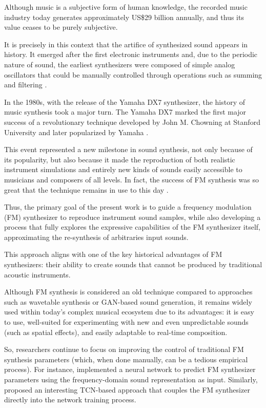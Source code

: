 \documentclass[10pt,conference]{IEEEtran}
\begin{document}
Although music is a subjective form of human knowledge, the recorded music industry today generates approximately US\$29 billion \cite{ifpi2025} annually, and thus its value ceases to be purely subjective.

It is precisely in this context that the artifice of synthesized sound appears in history. It emerged after the first electronic instruments and, due to the periodic nature of sound, the earliest synthesizers were composed of simple analog oscillators that could be manually controlled through operations such as summing and filtering \cite{holmes2016electronic}.

In the 1980s, with the release of the Yamaha DX7 synthesizer, the history of music synthesis took a major turn. The Yamaha DX7 marked the first major success of a revolutionary technique developed by John M. Chowning at Stanford University and later popularized by Yamaha \cite{claesson2021resynthesis}.

This event represented a new milestone in sound synthesis, not only because of its popularity, but also because it made the reproduction of both realistic instrument simulations and entirely new kinds of sounds easily accessible to musicians and composers of all levels. In fact, the success of FM synthesis was so great that the technique remains in use to this day \cite{holmes2016electronic}.

Thus, the primary goal of the present work is to guide a frequency modulation (FM) synthesizer to reproduce instrument sound samples, while also developing a process that fully explores the expressive capabilities of the FM synthesizer itself, approximating the re-synthesis of arbitraries input sounds.

This approach aligns with one of the key historical advantages of FM synthesizers: their ability to create sounds that cannot be produced by traditional acoustic instruments.

Although FM synthesis is considered an old technique compared to approaches such as wavetable synthesis or GAN-based sound generation, it remains widely used within today’s complex musical ecosystem due to its advantages: it is easy to use, well-suited for experimenting with new and even unpredictable sounds (such as spatial effects), and easily adaptable to real-time composition.

So, researchers continue to focus on improving the control of traditional FM synthesis parameters (which, when done manually, can be a tedious empirical process). For instance, \cite{claesson2021resynthesis} implemented a neural network to predict FM synthesizer parameters using the frequency-domain sound representation as input. Similarly, \cite{steinmetz2022ddx7} proposed an interesting TCN-based approach that couples the FM synthesizer directly into the network training process.
\end{document}
